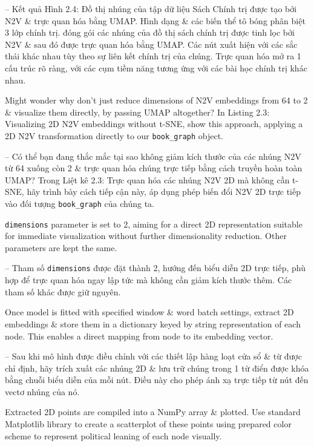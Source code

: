 \documentclass{article}
\begin{document}
\begin{itemize}
\begin{itemize}
\begin{itemize}
           -- Kết quả {\sf Hình 2.4: Đồ thị nhúng của tập dữ liệu Sách Chính trị được tạo bởi N2V \& trực quan hóa bằng UMAP. Hình dạng \& các biến thể tô bóng phân biệt 3 lớp chính trị.} đóng gói các nhúng của đồ thị sách chính trị được tinh lọc bởi N2V \& sau đó được trực quan hóa bằng UMAP. Các nút xuất hiện với các sắc thái khác nhau tùy theo sự liên kết chính trị của chúng. Trực quan hóa mở ra 1 cấu trúc rõ ràng, với các cụm tiềm năng tương ứng với các bài học chính trị khác nhau.

           Might wonder why don't just reduce dimensions of N2V embeddings from 64 to 2 \& visualize them directly, by passing UMAP altogether? In {\sf Listing 2.3: Visualizing 2D N2V embeddings without t-SNE}, show this approach, applying a 2D N2V transformation directly to our \verb|book_graph| object.

           -- Có thể bạn đang thắc mắc tại sao không giảm kích thước của các nhúng N2V từ 64 xuống còn 2 \& trực quan hóa chúng trực tiếp bằng cách truyền hoàn toàn UMAP? Trong {\sf Liệt kê 2.3: Trực quan hóa các nhúng N2V 2D mà không cần t-SNE}, hãy trình bày cách tiếp cận này, áp dụng phép biến đổi N2V 2D trực tiếp vào đối tượng \verb|book_graph| của chúng ta.

           {\tt dimensions} parameter is set to 2, aiming for a direct 2D representation  suitable for immediate visualization without further dimensionality reduction. Other parameters are kept the same.

           -- Tham số {\tt dimensions} được đặt thành 2, hướng đến biểu diễn 2D trực tiếp, phù hợp để trực quan hóa ngay lập tức mà không cần giảm kích thước thêm. Các tham số khác được giữ nguyên.

           Once model is fitted with specified window \& word batch settings, extract 2D embeddings \& store them in a dictionary keyed by string representation of each node. This enables a direct mapping from node to its embedding vector.

           -- Sau khi mô hình được điều chỉnh với các thiết lập hàng loạt cửa sổ \& từ được chỉ định, hãy trích xuất các nhúng 2D \& lưu trữ chúng trong 1 từ điển được khóa bằng chuỗi biểu diễn của mỗi nút. Điều này cho phép ánh xạ trực tiếp từ nút đến vectơ nhúng của nó.

           Extracted 2D points are compiled into a NumPy array \& plotted. Use standard Matplotlib library to create a scatterplot of these points using prepared color scheme to represent political leaning of each node visually.


\end{itemize}
\end{itemize}
\end{itemize}
\end{document}
